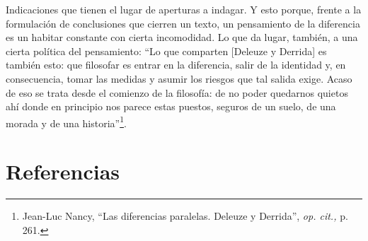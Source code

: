 Indicaciones que tienen el lugar de aperturas a indagar. Y esto porque, frente a la formulación de conclusiones que cierren un texto, un pensamiento de la diferencia es un habitar constante con cierta incomodidad. Lo que da lugar, también, a una cierta política del pensamiento: \enquote{Lo que comparten {[}Deleuze y Derrida{]} es también esto: que filosofar es entrar en la diferencia, salir de la identidad y, en consecuencia, tomar las medidas y asumir los riesgos que tal salida exige. Acaso de eso se trata desde el comienzo de la filosofía: de no poder quedarnos quietos ahí donde en principio nos parece estas puestos, seguros de un suelo, de una morada y de una historia}\footnote{Jean-Luc Nancy, \enquote{Las diferencias paralelas. Deleuze y Derrida}, \emph{op. cit.,} p. 261.}.

\section*{Referencias}
\printbibliography[heading=none]

